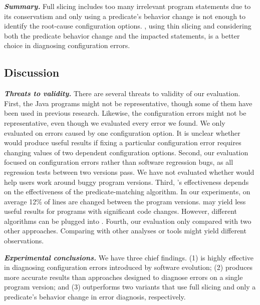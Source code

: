 \vspace{1mm}
\noindent \textbf{\textit{Summary.}} Full slicing
includes too many irrelevant program statements due to its
conservatism and only using a predicate's behavior
change is not enough to identify the root-cause configuration options.
\ourtool, using thin slicing and considering both
the predicate behavior change and the impacted statements,
is a better choice in diagnosing configuration errors.

\subsection{Discussion}

\noindent \textbf{\textit{Threats to validity.}}
There are several threats to validity of our evaluation.
First, the \subjnum Java programs might not be representative, though some of them have been
used in previous research. Likewise, the
\errornum configuration errors might not be representative, even though we
evaluated every error we found. 
We only evaluated \ourtool on errors
caused by one configuration option.
It is unclear whether \ourtool would produce
useful results if fixing a particular configuration error
requires changing values of two dependent configuration options.
%
Second, our evaluation focused on configuration errors
rather than software regression bugs, as all regression
tests between two versions pass. We have not evaluated
whether \ourtool would help users work around
buggy program versions.
Third, \ourtool's effectiveness depends on the effectiveness of the
predicate-matching algorithm. In our experiments,
on average 12\% of lines are changed between the program
versions. \ourtool may yield less
useful results for programs with significant code changes.
However, different algorithms can be plugged into \ourtool.
Fourth, our evaluation only compared \ourtool with two other
approaches. Comparing with other analyses or tools might yield
different observations.

\vspace{1mm}

\noindent \textbf{\textit{Experimental conclusions.}}
We have three chief findings. (1) \ourtool is highly effective
in diagnosing configuration errors introduced by software 
evolution; (2) \ourtool produces more accurate results than
approaches designed to diagnose errors on a single program version;
and (3) \ourtool outperforms two variants
that use full slicing and only  a predicate's
behavior change in error diagnosis, respectively.

